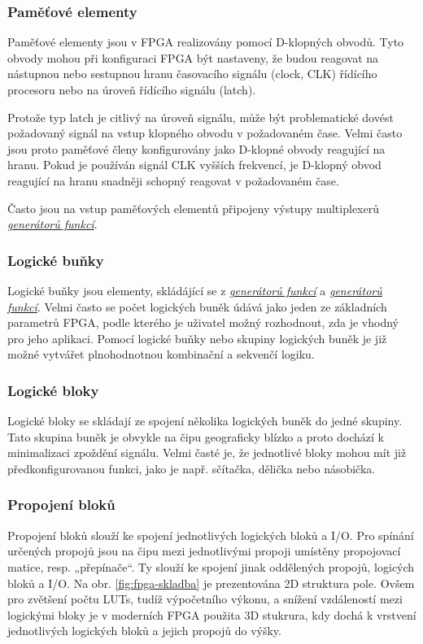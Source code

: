 \documentclass[a4paper, twoside, 11pt]{article}
\begin{document}
	\subsubsection{Paměťové elementy}\label{subsubsec:pametove-elementy}
		Paměťové elementy jsou v FPGA realizovány pomocí D-klopných obvodů. Tyto obvody mohou při konfiguraci FPGA být nastaveny, že budou reagovat na nástupnou nebo sestupnou hranu časovacího signálu (clock, CLK) řídícího procesoru nebo na úroveň řídícího signálu (latch).\cite{Sass2010}\par
		Protože typ latch je citlivý na úroveň signálu, může být problematické dovést požadovaný signál na vstup klopného obvodu v požadovaném čase. Velmi často jsou proto paměťové členy konfigurovány jako D-klopné obvody reagující na hranu. Pokud je používán signál CLK vyšších frekvencí, je D-klopný obvod reagující na hranu snadněji schopný reagovat v požadovaném čase. \cite{Sass2010}\par
		Často jsou na vstup paměťových elementů připojeny výstupy multiplexerů \hyperref[subsubsec:generatory-funkci]{\textit{generátorů funkcí}}. \cite{Sass2010}

		\subsubsection{Logické buňky}
			Logické buňky jsou elementy, skládájící se z \hyperref[subsubsec:generatory-funkci]{\textit{generátorů funkcí}} a \hyperref[subsubsec:generatory-funkci]{\textit{generátorů funkcí}}. Velmi často se počet logických buněk údává jako jeden ze základních parametrů FPGA, podle kterého je uživatel možný rozhodnout, zda je vhodný pro jeho aplikaci. Pomocí logické buňky nebo skupiny logických buněk je již možné vytvářet plnohodnotnou kombinační a sekvenčí logiku.\cite{Sass2010}

		\subsubsection{Logické bloky}\label{subsubsec:logicke-bloky}
			Logické bloky se skládají ze spojení několika logických buněk do jedné skupiny. Tato skupina buněk je obvykle na čipu geograficky blízko a proto dochází k minimalizaci zpoždění signálu. Velmi časté je, že jednotlivé bloky mohou mít již předkonfigurovanou funkci, jako je např. sčítačka, dělička nebo násobička. \cite{Sass2010}

		\subsubsection{Propojení bloků}
			Propojení bloků slouží ke spojení jednotlivých logických bloků a I/O. Pro spínání určených propojů jsou na čipu mezi jednotlivými propoji umístěny propojovací matice, resp. „přepínače“. Ty slouží ke spojení jinak oddělených propojů, logicých bloků a I/O. \cite{Sass2010}
			Na obr. \ref{fig:fpga-skladba} je prezentována 2D struktura pole. Ovšem pro zvětšení počtu LUTs, tudíž výpočetního výkonu, a snížení vzdáleností mezi logickými bloky je v moderních FPGA použita 3D stukrura, kdy dochá k vrstvení jednotlivých logických bloků a jejich propojů do výšky. \cite{pang-beginning-fpga}
\end{document}
